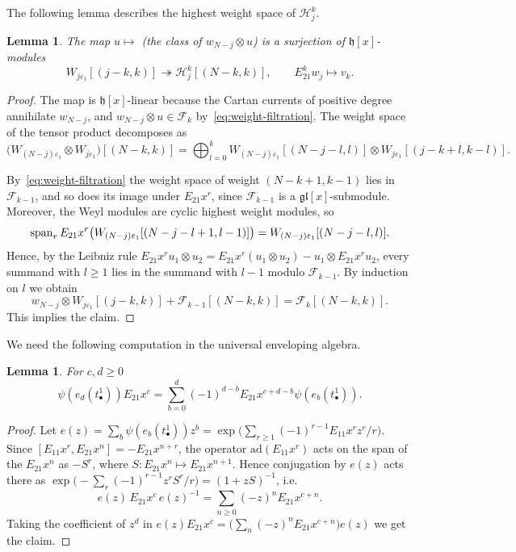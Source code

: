 \documentclass[11pt]{amsart}
\numberwithin{equation}{section}
\newtheorem{lemma}[equation]{Lemma}
\theoremstyle{definition}
\newcommand{\gl}{\mathfrak{gl}}
\newcommand{\fh}{\mathfrak{h}}
\newcommand{\eps}{\varepsilon}
\begin{document}
	The following lemma describes the highest weight space of $\mathcal H_j^k$.
	\begin{lemma}\label{lem:hw-space}
		The map $u\mapsto$ (the class of $w_{N-j}\otimes u$) is a surjection of $\fh[x]$-modules
		\[W_{j \eps_1}[(j-k,k)] \twoheadrightarrow \mathcal{H}_j^k[(N-k,k)],\qquad E_{21}^kw_j\mapsto v_k.\]
	\end{lemma}
	\begin{proof}
		The map is $\fh[x]$-linear because the Cartan currents of positive degree annihilate $w_{N-j}$, and $w_{N-j}\otimes u\in\mathcal F_k$ by~\eqref{eq:weight-filtration}. The weight space of the tensor product decomposes as
		\[\big(W_{(N-j)\eps_1}\otimes W_{j\eps_1}\big)[(N-k,k)]=\bigoplus_{l=0}^k W_{(N-j)\eps_1}[(N-j-l,l)]\otimes W_{j\eps_1}[(j-k+l,k-l)].\]
		
		By~\eqref{eq:weight-filtration} the weight space of weight $(N-k+1,k-1)$ lies in $\mathcal F_{k-1}$, and so does its image under $E_{21}x^r$, since $\mathcal F_{k-1}$ is a $\gl[x]$-submodule. Moreover, the Weyl modules are cyclic highest weight modules, so
		\[{\rm span}_r\, E_{21}x^r\big(W_{(N-j)\eps_1}[(N-j-l+1,l-1)]\big)=W_{(N-j)\eps_1}[(N-j-l,l)].\]
		Hence, by the Leibniz rule $E_{21}x^ru_1\otimes u_2=E_{21}x^r(u_1\otimes u_2)-u_1\otimes E_{21}x^ru_2$, every summand with $l\ge1$ lies in the summand with $l-1$ modulo $\mathcal F_{k-1}$. By induction on $l$ we obtain
		\[w_{N-j}\otimes W_{j\eps_1}[(j-k,k)]+\mathcal{F}_{k-1}[(N-k,k)]=\mathcal{F}_{k}[(N-k,k)].\]
		This implies the claim.
	\end{proof}
	
	We need the following computation in the universal enveloping algebra.
	\begin{lemma}\label{lem:comm}
		For $c,d\ge0$
		\[
		\psi(e_d(t^1_\bullet))E_{21}x^{c}=\sum_{b=0}^{d}(-1)^{d-b}E_{21}x^{c+d-b}\psi(e_b(t^1_\bullet)).
		\]
	\end{lemma}
	\begin{proof}
		Let $e(z)=\sum_b\psi(e_b(t^1_\bullet))z^b=\exp\big(\sum_{r\ge1}(-1)^{r-1}E_{11}x^rz^r/r\big)$. Since $[E_{11}x^r,E_{21}x^n]=-E_{21}x^{n+r}$, the operator $\mathrm{ad}(E_{11}x^r)$ acts on the span of the $E_{21}x^n$ as $-S^r$, where $S\colon E_{21}x^n\mapsto E_{21}x^{n+1}$. Hence conjugation by $e(z)$ acts there as $\exp\big(-\sum_r(-1)^{r-1}z^rS^r/r\big)=(1+zS)^{-1}$, i.e.
		\begin{equation}\label{eq:conj-e}
			e(z)\,E_{21}x^c\,e(z)^{-1}=\sum_{n\ge0}(-z)^nE_{21}x^{c+n}.
		\end{equation}
		Taking the coefficient of $z^d$ in $e(z)E_{21}x^c=\big(\sum_n(-z)^nE_{21}x^{c+n}\big)e(z)$ we get the claim.
	\end{proof}
	
\end{document}
